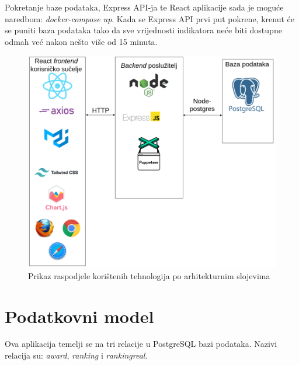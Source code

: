 \documentclass[times, utf8, zavrsni]{fer}
\begin{document}
Pokretanje baze podataka, Express API-ja te React aplikacije sada je moguće \\naredbom: \emph{docker-compose up}. Kada se Express API prvi put pokrene, krenut će se 
puniti baza podataka tako da sve vrijednosti indikatora neće biti dostupne odmah već nakon nešto više od 15 minuta.
\begin{figure}[htb]
    \centering
    \includegraphics[scale=0.3]{tehnologije.png}
    \caption{Prikaz raspodjele korištenih tehnologija po arhitekturnim slojevima}
    \label{fig:arhitektura}
    \end{figure}
           \chapter{Podatkovni model}
           Ova aplikacija temelji se na tri relacije u PostgreSQL bazi podataka. Nazivi relacija su: \emph{award}, \emph{ranking} i \emph{rankingreal}.
\end{document}
